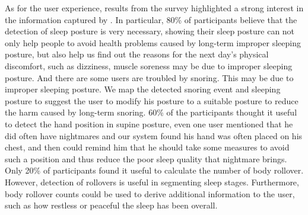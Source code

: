 As for the user experience, results from the survey highlighted a strong interest in the information captured by {\systemname}. In particular, 80\% of participants believe that the detection of sleep posture is very necessary, showing their sleep posture can not only help people to avoid health problems caused by long-term improper sleeping posture, but also help us find out the reasons for the next day's physical discomfort, such as dizziness, muscle soreness may be due to improper sleeping posture. And there are some users are troubled by snoring. This may be due to improper sleeping posture. We map the detected snoring event and sleeping posture to suggest the user to modify his posture to a suitable posture to reduce the harm caused by long-term snoring. 60\% of the participants thought it useful to detect the hand position in supine posture, even one user mentioned that he did often have nightmares and our system found his hand was often placed on his chest, and then {\systemname} could remind him that he should take some measures to avoid such a position and thus reduce the poor sleep quality that nightmare brings. Only 20\% of participants found it useful to calculate the number of body rollover. However, detection of rollovers is useful in segmenting sleep stages. Furthermore, body rollover counts could be used to derive additional information to the user, such as how restless or peaceful the sleep has been overall.
